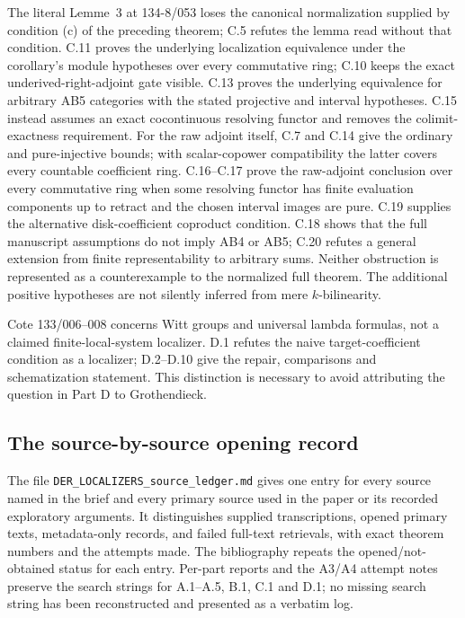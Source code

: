 The literal Lemme~3 at 134-8/053 loses the canonical normalization supplied by condition (c) of the preceding theorem; C.5 refutes the lemma read without that condition. C.11 proves the underlying localization equivalence under the corollary's module hypotheses over every commutative ring; C.10 keeps the exact underived-right-adjoint gate visible. C.13 proves the underlying equivalence for arbitrary AB5 categories with the stated projective and interval hypotheses. C.15 instead assumes an exact cocontinuous resolving functor and removes the colimit-exactness requirement. For the raw adjoint itself, C.7 and C.14 give the ordinary and pure-injective bounds; with scalar-copower compatibility the latter covers every countable coefficient ring. C.16--C.17 prove the raw-adjoint conclusion over every commutative ring when some resolving functor has finite evaluation components up to retract and the chosen interval images are pure. C.19 supplies the alternative disk-coefficient coproduct condition. C.18 shows that the full manuscript assumptions do not imply AB4 or AB5; C.20 refutes a general extension from finite representability to arbitrary sums. Neither obstruction is represented as a counterexample to the normalized full theorem. The additional positive hypotheses are not silently inferred from mere $k$-bilinearity.

Cote 133/006--008 concerns Witt groups and universal lambda formulas, not a claimed finite-local-system localizer. D.1 refutes the naive target-coefficient condition as a localizer; D.2--D.10 give the repair, comparisons and schematization statement. This distinction is necessary to avoid attributing the question in Part D to Grothendieck.

\subsection{The source-by-source opening record}
The file \texttt{DER\_LOCALIZERS\_source\_ledger.md} gives one entry for every source named in the brief and every primary source used in the paper or its recorded exploratory arguments. It distinguishes supplied transcriptions, opened primary texts, metadata-only records, and failed full-text retrievals, with exact theorem numbers and the attempts made. The bibliography repeats the opened/not-obtained status for each entry. Per-part reports and the A3/A4 attempt notes preserve the search strings for A.1--A.5, B.1, C.1 and D.1; no missing search string has been reconstructed and presented as a verbatim log.

